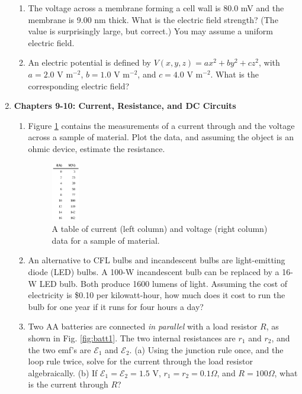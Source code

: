 \documentclass[10pt]{article}
\begin{document}
\begin{enumerate}
\begin{enumerate}
\item The voltage across a membrane forming a cell wall is 80.0 mV and the membrane is 9.00 nm thick. What is the electric field strength? (The value is surprisingly large, but correct.) You may assume a uniform electric field. \\ \vspace{2cm}
\item An electric potential is defined by $V(x,y,z) = a x^2 + b y^2 + c z^2$, with $a = 2.0$ V m$^{-2}$, $b = 1.0$ V m$^{-2}$, and $c = 4.0$ V m$^{-2}$.  What is the corresponding electric field? \\ \vspace{2cm}
\end{enumerate}
\item \textbf{Chapters 9-10: Current, Resistance, and DC Circuits}
\begin{enumerate}
\item Figure \ref{fig:OhmsTable} contains the measurements of a current through and the voltage across a sample of material. Plot the data, and assuming the object is an ohmic device, estimate the resistance. \\ \vspace{3cm}
\begin{figure}
\centering
\includegraphics[width=0.12\textwidth]{OhmsTable.png}
\caption{\label{fig:OhmsTable} A table of current (left column) and voltage (right column) data for a sample of material.}
\end{figure}
\item An alternative to CFL bulbs and incandescent bulbs are light-emitting diode (LED) bulbs. A 100-W incandescent bulb can be replaced by a 16-W LED bulb.  Both produce 1600 lumens of light. Assuming the cost of electricity is \$0.10 per kilowatt-hour, how much does it cost to run the bulb for one year if it runs for four hours a day? \\ \vspace{2cm}
\item Two AA batteries are connected \textit{in parallel} with a load resistor $R$, as shown in Fig. \ref{fig:batt1}.  The two internal resistances are $r_1$ and $r_2$, and the two emf's are $\mathcal{E}_1$ and $\mathcal{E}_2$. (a) Using the junction rule once, and the loop rule twice, solve for the current through the load resistor algebraically. (b) If  $\mathcal{E}_1 = \mathcal{E}_2 = 1.5$ V, $r_1 = r_2 = 0.1 \Omega$, and $R = 100\Omega$, what is the current through $R$? \\ \vspace{4cm}

\end{enumerate}
\end{enumerate}
\end{document}

